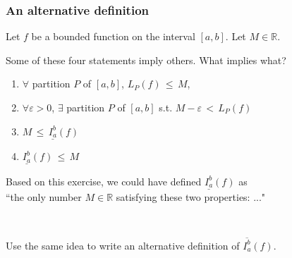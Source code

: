 \documentclass[14pt]{beamer}
\newcommand {\DS} [1] {${\displaystyle #1}$}
\newcommand {\R}{\mathbb{R}}
\newcommand{\e}{\varepsilon}
\newcommand{\p}{\pause}
\newcommand{\setsize}[1]{\fontsize{#1}{#1}\selectfont} %
\newcommand{\smallerfont}{\setsize{13}} %
\newcommand{\lifab}{\underline{I_a^b}(f)}
\newcommand{\uifab}{\overline{I_a^b}(f)}
\begin{document}
\begin{frame}[t]
\smallerfont
\frametitle{An alternative definition}

Let $f$ be a bounded function on the interval $[a,b]$.  
Let $M \in \R$. 

Some of these four statements imply others.  What implies what?
\vspace{.2cm}
\begin{enumerate}
	\item   $\forall$ partition $P$ of $[a,b]$, \; \DS{L_P(f) \,\leq\, M},
\vspace{.2cm}
	\item   $\forall \e>0$, $\exists$ partition $P$ of $[a,b]$ \; s.t. \; \DS{M - \e \,< \, L_P(f)}
\vspace{.2cm}
	\item \DS{M \, \leq \, \lifab}
	\item \DS{\lifab \, \leq \, M}
\end{enumerate}

\p \vfill

Based on this exercise, we could have defined $\lifab$ as \\``the only number $M \in \R$ satisfying these two properties: ..."

\

Use the same idea to write an alternative definition of $\uifab$.

\vfill

\end{frame}
\end{document}
